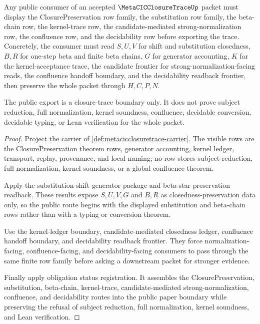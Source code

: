 \begin{theorem}
\label{thm:metacic-closure-trace-public-boundary}
Any public consumer of an accepted $\MetaCICClosureTraceUp$ packet must display the ClosurePreservation row family, the substitution row family, the beta-chain row, the kernel-trace row, the candidate-mediated strong-normalization row, the confluence row, and the decidability row before exporting the trace. Concretely, the consumer must read $S,U,V$ for shift and substitution closedness, $B,R$ for one-step beta and finite beta chains, $G$ for generator accounting, $K$ for the kernel-acceptance trace, the candidate frontier for strong-normalization-facing reads, the confluence handoff boundary, and the decidability readback frontier, then preserve the whole packet through $H,C,P,N$.

The public export is a closure-trace boundary only. It does not prove subject reduction, full normalization, kernel soundness, confluence, decidable conversion, decidable typing, or Lean verification for the whole packet.
\end{theorem}
\begin{proof}
Project the carrier of \autoref{def:metacicclosuretrace-carrier}. The visible rows are the ClosurePreservation theorem rows, generator accounting, kernel ledger, transport, replay, provenance, and local naming; no row stores subject reduction, full normalization, kernel soundness, or a global confluence theorem.

Apply the substitution-shift generator package and beta-star preservation readback. These results expose $S,U,V,G$ and $B,R$ as closedness-preservation data only, so the public route begins with the displayed substitution and beta-chain rows rather than with a typing or conversion theorem.

Use the kernel-ledger boundary, candidate-mediated closedness ledger, confluence handoff boundary, and decidability readback frontier. They force normalization-facing, confluence-facing, and decidability-facing consumers to pass through the same finite row family before asking a downstream packet for stronger evidence.

Finally apply obligation status registration. It assembles the ClosurePreservation, substitution, beta-chain, kernel-trace, candidate-mediated strong-normalization, confluence, and decidability routes into the public paper boundary while preserving the refusal of subject reduction, full normalization, kernel soundness, and Lean verification.
\end{proof}

